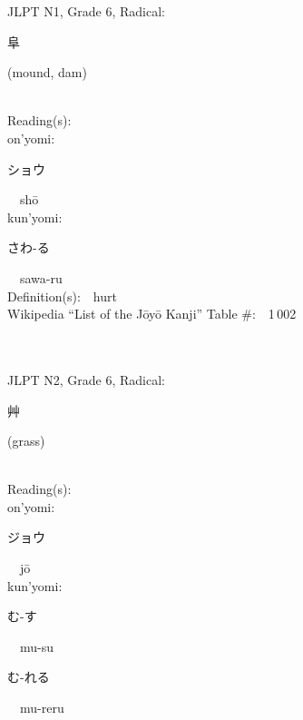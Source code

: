 \begin{multicols}{2}
{JLPT N1, Grade 6, Radical:\ \ {\begin{CJK}{UTF8}{min} 阜 \end{CJK}} (mound, dam) } \\
Reading(s):\ \ \\
{\hspace*{1em}}on'yomi:\ \ \\
{\hspace*{2em}}{\begin{CJK}{UTF8}{min} ショウ \end{CJK}}\ \ sh\=o\ \ \\
{\hspace*{1em}}kun'yomi:\ \ \\
{\hspace*{2em}}{\begin{CJK}{UTF8}{min} さわ-る \end{CJK}}\ \ sawa-ru\ \ \\
Definition(s):\ \ hurt \\
Wikipedia ``List of the J\=oy\=o Kanji'' Table \#:\ \ 1\,002 \\
\ \ \\
{\fontsize{34pt}{40pt}  }\ \ \\  %
{JLPT N2, Grade 6, Radical:\ \ {\begin{CJK}{UTF8}{min} 艸 \end{CJK}} (grass) } \\
Reading(s):\ \ \\
{\hspace*{1em}}on'yomi:\ \ \\
{\hspace*{2em}}{\begin{CJK}{UTF8}{min} ジョウ \end{CJK}}\ \ j\=o\ \ \\
{\hspace*{1em}}kun'yomi:\ \ \\
{\hspace*{2em}}{\begin{CJK}{UTF8}{min} む-す \end{CJK}}\ \ mu-su\ \ \\
{\hspace*{2em}}{\begin{CJK}{UTF8}{min} む-れる \end{CJK}}\ \ mu-reru\ \ \\

\end{multicols}
